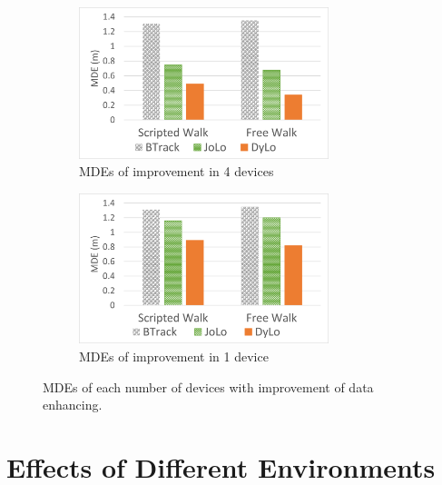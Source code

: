 \documentclass[a4paper,12pt]{report}
\begin{document}
\begin{figure}[tbph]%
    \begin{subfigure}{1\linewidth}
    \centering
        \includegraphics[width=0.8\textwidth]{images/5_3_Data_Enhancing_MDE_4.png}
        \caption{MDEs of improvement in 4 devices}
        \label{figure:5_3_Data_Enhancing_MDE_4}
    \end{subfigure}
    \begin{subfigure}{1\linewidth}
    \centering
        \includegraphics[width=0.8\textwidth]{images/5_3_Data_Enhancing_MDE_1.png}
        \caption{MDEs of improvement in 1 device}
        \label{figure:5_3_Data_Enhancing_MDE_1}
    \end{subfigure}
\caption{MDEs of each number of devices with improvement of data enhancing.}
\label{figure:5_3_Data_Enhancing_MDE}
\end{figure}


\section{Effects of Different Environments}
\end{document}
